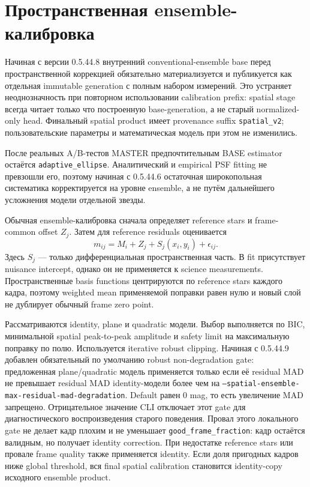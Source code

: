 \section{Пространственная ensemble-калибровка}
\label{sec:spatial-ensemble}

Начиная с версии 0.5.44.8 внутренний conventional-ensemble base перед пространственной коррекцией обязательно материализуется и публикуется как отдельная immutable generation с полным набором измерений. Это устраняет неоднозначность при повторном использовании calibration prefix: spatial stage всегда читает только что построенную base-generation, а не старый normalized-only head. Финальный spatial product имеет provenance suffix \texttt{spatial\_v2}; пользовательские параметры и математическая модель при этом не изменились.


После реальных A/B-тестов MASTER предпочтительным BASE estimator остаётся
\texttt{adaptive\_ellipse}. Аналитический и empirical PSF fitting не превзошли его, поэтому
начиная с 0.5.44.6 остаточная широкопольная систематика корректируется на уровне ensemble, а не
путём дальнейшего усложнения модели отдельной звезды.

Обычная ensemble-калибровка сначала определяет reference stars и frame-common offset $Z_j$.
Затем для reference residuals оценивается
\begin{equation}
 m_{ij}=M_i+Z_j+S_j(x_i,y_i)+\epsilon_{ij}.
\end{equation}
Здесь $S_j$ --- только дифференциальная пространственная часть. В fit присутствует nuisance
intercept, однако он не применяется к science measurements. Пространственные basis functions
центрируются по reference stars каждого кадра, поэтому weighted mean применяемой поправки равен
нулю и новый слой не дублирует обычный frame zero point.

Рассматриваются identity, plane и quadratic модели. Выбор выполняется по BIC, минимальной
spatial peak-to-peak amplitude и safety limit на максимальную поправку по полю. Используется
iterative robust clipping. Начиная с 0.5.44.9 добавлен обязательный по умолчанию robust
non-degradation gate: предложенная plane/quadratic модель применяется только если её residual MAD
не превышает residual MAD identity-модели более чем на
\texttt{--spatial-ensemble-max-residual-mad-degradation}. Default равен 0 mag, то есть увеличение
MAD запрещено. Отрицательное значение CLI отключает этот gate для диагностического воспроизведения
старого поведения. Провал этого локального gate не делает кадр плохим и не уменьшает
\texttt{good\_frame\_fraction}: кадр остаётся валидным, но получает identity correction. При
недостатке reference stars или провале frame quality также применяется identity. Если доля пригодных
кадров ниже global threshold, вся final spatial calibration становится identity-copy исходного
ensemble product.

